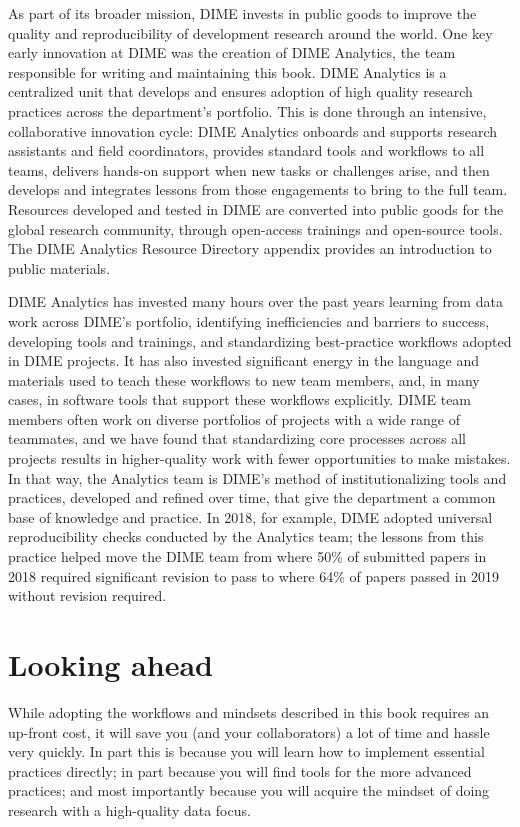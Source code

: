 As part of its broader mission, DIME invests in public goods
to improve the quality and reproducibility of development research around the world.
One key early innovation at DIME was the creation of DIME Analytics,
the team responsible for writing and maintaining this book.
DIME Analytics is a centralized unit that develops and ensures adoption
of high quality research practices across the department's portfolio.
This is done through an intensive, collaborative innovation cycle:
DIME Analytics onboards and supports research assistants and field coordinators,
provides standard tools and workflows to all teams,
delivers hands-on support when new tasks or challenges arise,
and then develops and integrates lessons from those engagements to bring to the full team.
Resources developed and tested in DIME are converted into public goods
for the global research community, through open-access trainings and open-source tools.
The DIME Analytics Resource Directory appendix provides an introduction to public materials.

DIME Analytics has invested many hours over the past years
learning from data work across DIME's portfolio,
identifying inefficiencies and barriers to success,
developing tools and trainings, and standardizing best-practice workflows adopted in DIME projects.
It has also invested significant energy in the language and materials
used to teach these workflows to new team members,
and, in many cases, in software tools that support these workflows explicitly.
DIME team members often work on diverse portfolios of projects
with a wide range of teammates, and we have found
that standardizing core processes across all projects
results in higher-quality work with fewer opportunities to make mistakes.
In that way, the Analytics team is DIME's method of institutionalizing
tools and practices, developed and refined over time,
that give the department a common base of knowledge and practice.
In 2018, for example, DIME adopted universal reproducibility checks
conducted by the Analytics team;
the lessons from this practice helped move the DIME team
from where 50\% of submitted papers in 2018
required significant revision to pass
to where 64\% of papers passed in 2019 without revision required.


\section{Looking ahead}
While adopting the workflows and mindsets described in this book requires an up-front cost,
it will save you (and your collaborators) a lot of time and hassle very quickly.
In part this is because you will learn how to implement essential practices directly;
in part because you will find tools for the more advanced practices;
and most importantly because you will acquire the mindset of doing research with a high-quality data focus.

